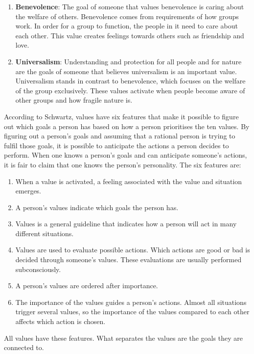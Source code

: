 \begin{enumerate}
    \item \textbf{Benevolence}: The goal of someone that values benevolence is caring about the welfare of others. Benevolence comes from requirements of how groups work. In order for a group to function, the people in it need to care about each other. This value creates feelings towards others such as friendship and love.
    
    \item \textbf{Universalism}: Understanding and protection for all people and for nature are the goals of someone that believes universalism is an important value. Universalism stands in contrast to benevolence, which focuses on the welfare of the group exclusively. These values activate when people become aware of other groups and how fragile nature is. 
\end{enumerate}

According to Schwartz, values have six features that make it possible to figure out which goals a person has based on how a person prioritises the ten values. By figuring out a person's goals and assuming that a rational person is trying to fulfil those goals, it is possible to anticipate the actions a person decides to perform. When one knows a person's goals and can anticipate someone's actions, it is fair to claim that one knows the person's personality. The six features are:
\begin{enumerate}
    \item When a value is activated, a feeling associated with the value and situation emerges.
    \item A person’s values indicate which goals the person has. 
    \item Values is a general guideline that indicates how a person will act in many different situations.
    \item Values are used to evaluate possible actions. Which actions are good or bad is decided through someone's values. These evaluations are usually performed subconsciously.
    \item A person’s values are ordered after importance.
    \item The importance of the values guides a person’s actions. Almost all situations trigger several values, so the importance of the values compared to each other affects which action is chosen.
\end{enumerate}
All values have these features. What separates the values are the goals they are connected to. 


